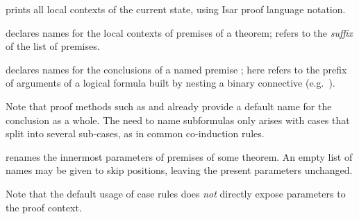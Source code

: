 \begin{isabellebody}
\begin{isamarkuptext}
\begin{descr}
  \item [\hyperlink{command.print_cases}{\mbox{\isa{\isacommand{print{\isacharunderscore}cases}}}}] prints all local contexts of the
  current state, using Isar proof language notation.
  
  \item [\hyperlink{attribute.case_names}{\mbox{\isa{case{\isacharunderscore}names}}}~\isa{{\isachardoublequote}c\isactrlsub {\isadigit{1}}\ {\isasymdots}\ c\isactrlsub k{\isachardoublequote}}]
  declares names for the local contexts of premises of a theorem;
   refers to the \emph{suffix} of the
  list of premises.
  
  \item [\hyperlink{attribute.case_conclusion}{\mbox{\isa{case{\isacharunderscore}conclusion}}}~\isa{{\isachardoublequote}c\ d\isactrlsub {\isadigit{1}}\ {\isasymdots}\ d\isactrlsub k{\isachardoublequote}}] declares names for the conclusions of a named premise
  ; here  refers to the
  prefix of arguments of a logical formula built by nesting a binary
  connective (e.g.\ \isa{{\isachardoublequote}{\isasymor}{\isachardoublequote}}).
  
  Note that proof methods such as \hyperlink{method.induct}{\mbox{}} and \hyperlink{method.coinduct}{\mbox{}} already provide a default name for the conclusion as a
  whole.  The need to name subformulas only arises with cases that
  split into several sub-cases, as in common co-induction rules.

  \item [\hyperlink{attribute.params}{\mbox{\isa{params}}}~\isa{{\isachardoublequote}p\isactrlsub {\isadigit{1}}\ {\isasymdots}\ p\isactrlsub m\ {\isasymAND}\ {\isasymdots}\ q\isactrlsub {\isadigit{1}}\ {\isasymdots}\ q\isactrlsub n{\isachardoublequote}}] renames the innermost parameters of
  premises  of some theorem.  An empty list of names
  may be given to skip positions, leaving the present parameters
  unchanged.
  
  Note that the default usage of case rules does \emph{not} directly
  expose parameters to the proof context.
  

\end{descr}
\end{isamarkuptext}
\end{isabellebody}
